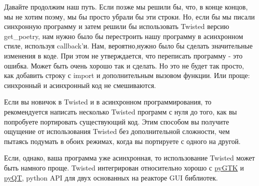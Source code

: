 
Давайте продолжим наш путь. Если позже мы решили бы, 
что, в конце концов, мы не хотим поэму, мы бы просто убрали бы 
эти строки. Но, если бы мы 
писали синхронную программу и затем решили бы использовать 
Twisted версию get\_poetry, нам нужно было бы перестроить 
нашу программу в асинхронном стиле, используя callback'и. 
Нам, вероятно,нужно было бы сделать значительные изменения в коде. 
При этом не утверждается, что переписать программу - это ошибка. 
Может быть очень хорошо так и сделать. Но это не будет так просто, как 
добавить строку с import и дополнительным вызовом функции. 
Или проще: синхронный и асинхронный код не смешиваются.  


Если вы новичок в Twisted и в асинхронном программирования, то 
рекомендуется написать несколько Twisted программ с нуля до того, как 
вы попробуете портировать существующий код. Этим способом вы получите 
ощущение от использования Twisted без дополнительной сложности, 
чем пытаясь подумать в обоих режимах, когда вы портируете с одного на 
другой.


Если, однако, ваша программа уже асинхронная, то 
использование Twisted может быть намного проще. Twisted 
интегрирован относительно хорошо с 
\href{http://pygtk.org/}{pyGTK} и
\href{http://wiki.python.org/moin/PyQt}{pyQT}, python API 
для двух основанных на реакторе GUI библиотек.

